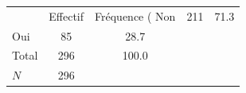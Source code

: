 {
\def\sym#1{\ifmmode^{#1}\else\(^{#1}\)\fi}
\begin{tabular}{l*{1}{cc}}
\toprule
            &    Effectif&Fréquence (%
\midrule
Non         &         211&        71.3\\
Oui         &          85&        28.7\\
Total       &         296&       100.0\\
\midrule
\(N\)       &         296&            \\
\bottomrule
\end{tabular}
}
